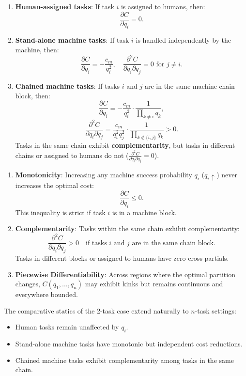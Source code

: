 \documentclass{article}
\begin{document}
\begin{enumerate}
    \item \textbf{Human-assigned tasks}: If task \(i\) is assigned to humans, then:
    \[
    \frac{\partial C}{\partial q_i} = 0.
    \]

    \item \textbf{Stand-alone machine tasks}: If task \(i\) is handled independently by the machine, then:
    \[
    \frac{\partial C}{\partial q_i} = -\frac{c_m}{q_i^2}, \quad \frac{\partial^2 C}{\partial q_i \partial q_j} = 0 \text{ for } j \neq i.
    \]

    \item \textbf{Chained machine tasks}: If tasks \(i\) and \(j\) are in the same machine chain block, then:
    \[
    \frac{\partial C}{\partial q_i} = -\frac{c_m}{q_i^2} \cdot \frac{1}{\prod_{k \neq i} q_k},
    \]
    \[
    \frac{\partial^2 C}{\partial q_i \partial q_j} = \frac{c_m}{q_i^2 q_j^2} \cdot \frac{1}{\prod_{k \not\in \{i, j\}} q_k} > 0.
    \]
    Tasks in the same chain exhibit \textbf{complementarity}, but tasks in different chains or assigned to humans do not (\(\frac{\partial^2 C}{\partial q_i \partial q_j} = 0\)).
\end{enumerate}

\begin{enumerate}
    \item \textbf{Monotonicity}: Increasing any machine success probability \(q_i\) (\(q_i \uparrow\)) never increases the optimal cost:
    \[
    \frac{\partial C}{\partial q_i} \leq 0.
    \]
    This inequality is strict if task \(i\) is in a machine block.

    \item \textbf{Complementarity}: Tasks within the same chain exhibit complementarity:
    \[
    \frac{\partial^2 C}{\partial q_i \partial q_j} > 0 \quad \text{if tasks } i \text{ and } j \text{ are in the same chain block}.
    \]
    Tasks in different blocks or assigned to humans have zero cross partials.

    \item \textbf{Piecewise Differentiability}: Across regions where the optimal partition changes, \(C(q_1, \dots, q_n)\) may exhibit kinks but remains continuous and everywhere bounded.
\end{enumerate}

The comparative statics of the 2-task case extend naturally to \(n\)-task settings:
\begin{itemize}
    \item Human tasks remain unaffected by \(q_i\).
    \item Stand-alone machine tasks have monotonic but independent cost reductions.
    \item Chained machine tasks exhibit complementarity among tasks in the same chain.
\end{itemize}
\end{document}
